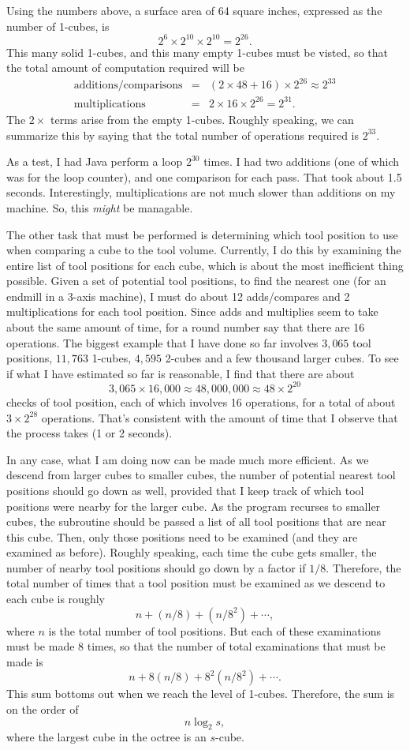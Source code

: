 \documentclass[titlepage,oneside,10pt]{article}
\begin{document}
Using the numbers above, a surface area of 64 square inches, expressed
as the number of 1-cubes, is
$$2^6\times 2^{10}\times 2^{10} = 2^{26}.$$
This many solid 1-cubes, and this many empty 1-cubes must be visted,
so that the total amount of computation required will be
\begin{eqnarray*}
\mbox{additions/comparisons} &=& (2\times 48+16)\times 2^{26}\approx 2^{33}\\
\mbox{multiplications} &=& 2\times 16\times 2^{26} = 2^{31}.
\end{eqnarray*}
The $2\times$ terms arise from the empty 1-cubes. Roughly speaking, we
can summarize this by saying that the total number of operations
required is $2^{33}$. 

As a test, I had Java perform a loop $2^{30}$ times. I had two
additions (one of which was for the loop counter), and one comparison for each
pass. That took about 1.5 seconds. Interestingly, multiplications are
not much slower than additions on my machine. So, this \emph{might} be
managable.

The other task that must be performed is determining which tool
position to use when comparing a cube to the tool volume. Currently, I
do this by examining the entire list of tool positions for each cube,
which is about the most inefficient thing possible. Given a set of
potential tool positions, to find the nearest one (for an endmill in a
3-axis machine), I must do about 12 adds/compares and 2
multiplications for each tool position. Since adds and multiplies seem
to take about the same amount of time, for a round number say that
there are 16 operations. The biggest example that I have done so far
involves $3,065$ tool positions, $11,763$ 1-cubes, $4,595$ 2-cubes and
a few thousand larger cubes. To see if what I have estimated so far is
reasonable, I find that there are about
$$3,065\times 16,000 \approx 48,000,000 \approx 48\times 2^{20}$$
checks of tool position, each of which involves 16 operations, for a
total of about $3\times 2^{28}$ operations. That's
consistent with the amount of time that I observe that the process
takes (1 or 2 seconds).

In any case, what I am doing now can be made much more efficient. As
we descend from larger cubes to smaller cubes, the number of potential
nearest tool positions should go down as well, provided that I keep
track of which tool positions were nearby for the larger cube. As the
program recurses to smaller cubes, the subroutine should be passed a
list of all tool positions that are near this cube. Then, only those
positions need to be examined (and they are examined as
before). Roughly speaking, each time the cube gets smaller, the number
of nearby tool positions should go down by a factor if
$1/8$. Therefore, the total number of times that a tool position must
be examined as we descend to each cube is roughly
$$n + (n/8) + (n/8^2) +\cdots,$$
where $n$ is the total number of tool positions. But each of these
examinations must be made 8 times, so that the number of total
examinations that must be made is
$$n + 8(n/8) + 8^2(n/8^2) +\cdots.$$
This sum bottoms out when we reach the level of 1-cubes. Therefore,
the sum is on the order of 
$$n \log_2 s,$$
where the largest cube in the octree is an $s$-cube.
\end{document}
